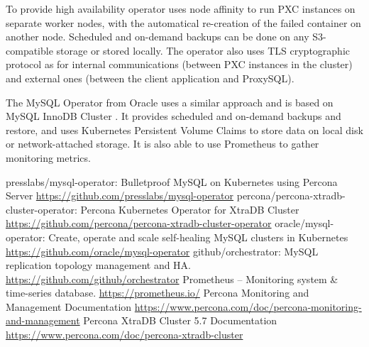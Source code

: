 \documentclass[10pt, a5paper]{article}
\begin{document}
To provide high availability operator uses node affinity to run PXC instances on separate worker nodes, with the automatical re-creation of the failed container on another node. Scheduled and on-demand backups can be done on any S3-compatible storage or stored locally. The operator also uses TLS cryptographic protocol as for internal communications (between PXC instances in the cluster) and external ones (between the client application and ProxySQL).

The MySQL Operator from Oracle uses a similar approach and is based on MySQL InnoDB Cluster \cite{bib3}. It provides scheduled and on-demand backups and restore, and uses Kubernetes Persistent Volume Claims to store data on local disk or network-attached storage. It is also able to use Prometheus to gather monitoring metrics.

\begin{thebibliography}{9}
 presslabs/mysql-operator: Bulletproof MySQL on Kubernetes using Percona Server \url{https://github.com/presslabs/mysql-operator}
 percona/percona-xtradb-cluster-operator: Percona Kubernetes Operator for XtraDB Cluster \url{https://github.com/percona/percona-xtradb-cluster-operator}
 oracle/mysql-operator: Create, operate and scale self-healing MySQL clusters in Kubernetes \url{https://github.com/oracle/mysql-operator}
 github/orchestrator: MySQL replication topology management and HA. \url{https://github.com/github/orchestrator}
 Prometheus -- Monitoring system \& time-series database. \url{https://prometheus.io/}
 Percona Monitoring and Management Documentation \url{https://www.percona.com/doc/percona-monitoring-and-management}
 Percona XtraDB Cluster 5.7 Documentation \url{https://www.percona.com/doc/percona-xtradb-cluster}
\end{thebibliography}
\end{document}
